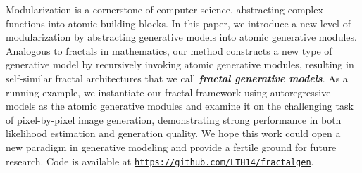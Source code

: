 

Modularization is a cornerstone of computer science, abstracting complex functions into atomic building blocks. In this paper, we introduce a new level of modularization by abstracting generative models into atomic generative modules. Analogous to fractals in mathematics, our method constructs a new type of generative model by recursively invoking atomic generative modules, resulting in self-similar fractal architectures that we call \emph{\textbf{fractal generative models}}.
As a running example, we instantiate our fractal framework using autoregressive models as the atomic generative modules and examine it on the challenging task of pixel-by-pixel image generation, demonstrating strong performance in both likelihood estimation and generation quality. We hope this work could open a new paradigm in generative modeling and provide a fertile ground for future research. Code is available at \href{https://github.com/LTH14/fractalgen}{\textcolor{LightRed}{\scriptsize{\texttt{https://github.com/LTH14/fractalgen}}}}.
\vspace{-15pt}